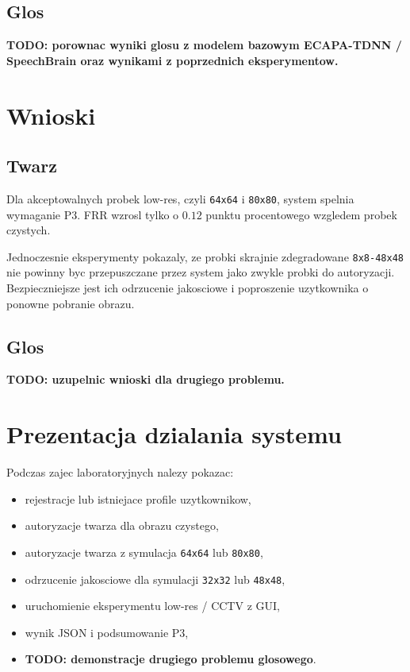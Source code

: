 \documentclass[12pt]{article}
\begin{document}
\subsection{Glos}

\textbf{TODO: porownac wyniki glosu z modelem bazowym ECAPA-TDNN / SpeechBrain oraz wynikami z poprzednich eksperymentow.}

\section{Wnioski}

\subsection{Twarz}

Dla akceptowalnych probek low-res, czyli \texttt{64x64} i \texttt{80x80}, system spelnia wymaganie P3. FRR wzrosl tylko o $0.12$ punktu procentowego wzgledem probek czystych.

Jednoczesnie eksperymenty pokazaly, ze probki skrajnie zdegradowane \texttt{8x8-48x48} nie powinny byc przepuszczane przez system jako zwykle probki do autoryzacji. Bezpieczniejsze jest ich odrzucenie jakosciowe i poproszenie uzytkownika o ponowne pobranie obrazu.

\subsection{Glos}

\textbf{TODO: uzupelnic wnioski dla drugiego problemu.}

\section{Prezentacja dzialania systemu}

Podczas zajec laboratoryjnych nalezy pokazac:

\begin{itemize}
    \item rejestracje lub istniejace profile uzytkownikow,
    \item autoryzacje twarza dla obrazu czystego,
    \item autoryzacje twarza z symulacja \texttt{64x64} lub \texttt{80x80},
    \item odrzucenie jakosciowe dla symulacji \texttt{32x32} lub \texttt{48x48},
    \item uruchomienie eksperymentu low-res / CCTV z GUI,
    \item wynik JSON i podsumowanie P3,
    \item \textbf{TODO: demonstracje drugiego problemu glosowego}.
\end{itemize}
\end{document}
